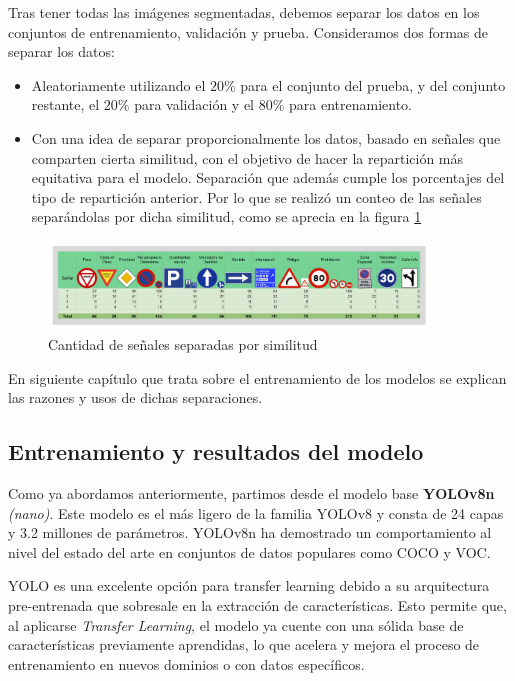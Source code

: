 \documentclass{article}
\begin{document}
Tras tener todas las imágenes segmentadas, debemos separar los datos en los conjuntos de entrenamiento, validación y prueba. Consideramos dos formas de separar los datos:

\begin{itemize}
\item{Aleatoriamente utilizando el $20\%$ para el conjunto del prueba, y del conjunto restante, el $20\%$ para validación y el $80\%$ para entrenamiento.}
\item{Con una idea de separar proporcionalmente los datos, basado en señales que comparten cierta similitud, con el objetivo de hacer la repartición más equitativa para el modelo. Separación que además cumple los porcentajes del tipo de repartición anterior. Por lo que se realizó un conteo de las señales separándolas por dicha similitud, como se aprecia en la figura \ref{fig:sign count}}
\end{itemize}
\begin{figure}[h]
\centering
\includegraphics[width=0.9\textwidth]{resources/sign count.png}
\caption{Cantidad de señales separadas por similitud}
\label{fig:sign count}
\end{figure}
En siguiente capítulo que trata sobre el entrenamiento de los modelos se explican las razones y usos de dichas separaciones.

\subsection{Entrenamiento y resultados del modelo}
Como ya abordamos anteriormente, partimos desde el modelo base \textbf{YOLOv8n} \textit{(nano)}. Este modelo es el más ligero de la familia YOLOv8 y consta de 24 capas y 3.2 millones de parámetros. YOLOv8n ha demostrado un comportamiento al nivel del estado del arte en conjuntos de datos populares como COCO y VOC. 

YOLO es una excelente opción para transfer learning debido a su arquitectura pre-entrenada que sobresale en la extracción de características. Esto permite que, al aplicarse \textit{Transfer Learning}, el modelo ya cuente con una sólida base de características previamente aprendidas, lo que acelera y mejora el proceso de entrenamiento en nuevos dominios o con datos específicos. 
\end{document}
